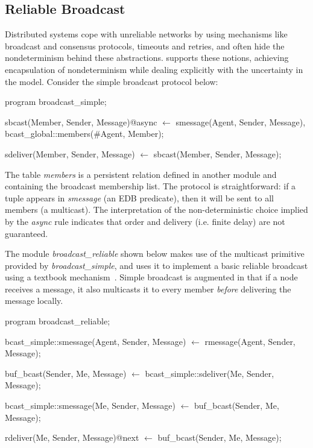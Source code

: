 \subsection{Reliable Broadcast}
Distributed systems cope with unreliable networks by using mechanisms like broadcast and consensus protocols, 
timeouts and retries, and often hide the nondeterminism behind these abstractions.  \lang supports these notions,
achieving encapsulation of nondeterminism while dealing explicitly with the uncertainty in the model.  Consider the simple
broadcast protocol below:


\begin{Dedalus}

program broadcast_simple;

sbcast(Member, Sender, Message)@async \(\leftarrow\)
    smessage(Agent, Sender, Message),
    bcast_global::members(#Agent, Member);

sdeliver(Member, Sender, Message) \(\leftarrow\)
    sbcast(Member, Sender, Message);

\end{Dedalus}

The table \emph{members} is a persistent relation defined in another module  and containing the broadcast 
membership list.  
The protocol is straightforward: if a tuple appears in \emph{smessage} (an EDB predicate), then
it will be sent to all members (a multicast).  The interpretation of the non-deterministic choice implied by the
\emph{async} rule indicates that order and delivery (i.e. finite delay) are not guaranteed.

The module \emph{broadcast\_reliable} shown below makes use of the multicast primitive provided by \emph{broadcast\_simple}, and
uses it to implement a basic reliable broadcast using a textbook mechanism~\cite{mullender}. 
Simple broadcast is augmented in that if a node receives a message, it 
also multicasts it to every member \emph{before} delivering the message locally.  


\begin{Dedalus}
program broadcast_reliable;

bcast_simple::smessage(Agent, Sender, Message)  \(\leftarrow\)
    rmessage(Agent, Sender, Message);

buf_bcast(Sender, Me, Message)  \(\leftarrow\)
    bcast_simple::sdeliver(Me, Sender, Message);

bcast_simple::smessage(Me, Sender, Message)  \(\leftarrow\)
    buf_bcast(Sender, Me, Message);

rdeliver(Me, Sender, Message)@next  \(\leftarrow\)
    buf_bcast(Sender, Me, Message);

\end{Dedalus}

